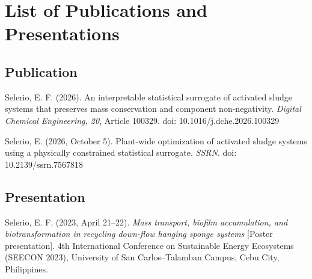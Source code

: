 \documentclass[12pt,twoside]{book}
\begin{document}
\cleardoublepage
\chapter*{List of Publications and Presentations}

\section*{Publication}

Selerio, E. F. (2026). An interpretable statistical surrogate of activated sludge systems that preserves mass
conservation and component non-negativity. \textit{Digital Chemical Engineering, 20}, Article 100329.
doi: 10.1016/j.dche.2026.100329

Selerio, E. (2026, October 5). Plant-wide optimization of activated sludge systems using a physically constrained statistical surrogate. \textit{SSRN}. doi: 10.2139/ssrn.7567818

\section*{Presentation}

Selerio, E. F. (2023, April 21--22). \textit{Mass transport, biofilm accumulation, and biotransformation in
recycling down-flow hanging sponge systems} [Poster presentation]. 4th International Conference on Sustainable
Energy Ecosystems (SEECON 2023), University of San Carlos--Talamban Campus, Cebu City, Philippines.
\end{document}
